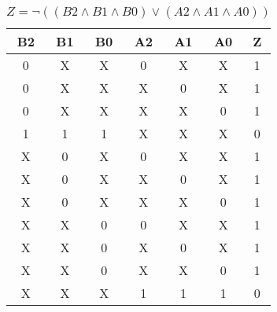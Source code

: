 
\begin{center}
    \begin{table}[h] \caption{\(Z = \lnot ((B2 \land B1 \land B0) \lor (A2 \land A1 \land A0)) \)}
        \begin{center}
            \begin{tabular}{|c|c|c|c|c|c||c|} \hline
            B2 & B1 & B0 & A2 & A1 & A0 & Z \\ \hline\hline
            0  & X  & X  & 0  & X  & X  & 1\\ \hline
            0  & X  & X  & X  & 0  & X  & 1\\ \hline
            0  & X  & X  & X  & X  & 0  & 1\\ \hline
            1  & 1  & 1  & X  & X  & X  & 0\\ \hline
            X  & 0  & X  & 0  & X  & X  & 1\\ \hline
            X  & 0  & X  & X  & 0  & X  & 1\\ \hline
            X  & 0  & X  & X  & X  & 0  & 1\\ \hline
            X  & X  & 0  & 0  & X  & X  & 1\\ \hline
            X  & X  & 0  & X  & 0  & X  & 1\\ \hline
            X  & X  & 0  & X  & X  & 0  & 1\\ \hline
            X  & X  & X  & 1  & 1  & 1  & 0\\ \hline
            \end{tabular}
        \end{center}
    \end{table}
\end{center}
